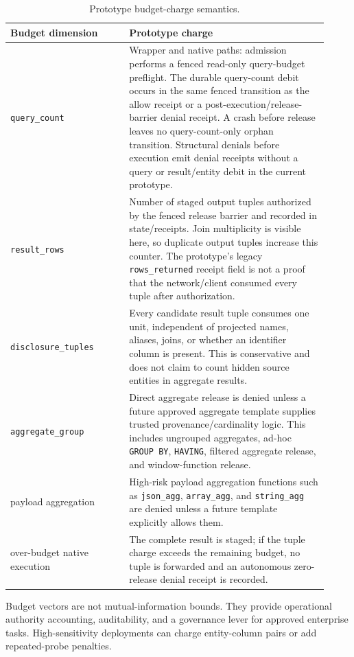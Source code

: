 \documentclass[journal]{IEEEtran}
\begin{document}
\begin{table}[!t]
\centering
\scriptsize
\setlength{\tabcolsep}{3pt}
\caption{Prototype budget-charge semantics.}
\label{tab:budget-charge}
\begin{tabular}{@{}p{0.34\linewidth}p{0.58\linewidth}@{}}
\toprule
Budget dimension & Prototype charge \\
\midrule
\texttt{query\_count} & Wrapper and native paths: admission performs a fenced read-only query-budget preflight. The durable query-count debit occurs in the same fenced transition as the allow receipt or a post-execution/release-barrier denial receipt. A crash before release leaves no query-count-only orphan transition. Structural denials before execution emit denial receipts without a query or result/entity debit in the current prototype. \\
\texttt{result\_rows} & Number of staged output tuples authorized by the fenced release barrier and recorded in state/receipts. Join multiplicity is visible here, so duplicate output tuples increase this counter. The prototype's legacy \texttt{rows\_returned} receipt field is not a proof that the network/client consumed every tuple after authorization. \\
\texttt{disclosure\_tuples} & Every candidate result tuple consumes one unit, independent of projected names, aliases, joins, or whether an identifier column is present. This is conservative and does not claim to count hidden source entities in aggregate results. \\
\texttt{aggregate\_group} & Direct aggregate release is denied unless a future approved aggregate template supplies trusted provenance/cardinality logic. This includes ungrouped aggregates, ad-hoc \texttt{GROUP\ BY}, \texttt{HAVING}, filtered aggregate release, and window-function release. \\
payload aggregation & High-risk payload aggregation functions such as \texttt{json\_agg}, \texttt{array\_agg}, and \texttt{string\_agg} are denied unless a future template explicitly allows them. \\
over-budget native execution & The complete result is staged; if the tuple charge exceeds the remaining budget, no tuple is forwarded and an autonomous zero-release denial receipt is recorded. \\
\bottomrule
\end{tabular}
\end{table}

Budget vectors are not mutual-information bounds. They provide
operational authority accounting, auditability, and a governance lever
for approved enterprise tasks. High-sensitivity deployments can charge
entity-column pairs or add repeated-probe penalties.
\end{document}
